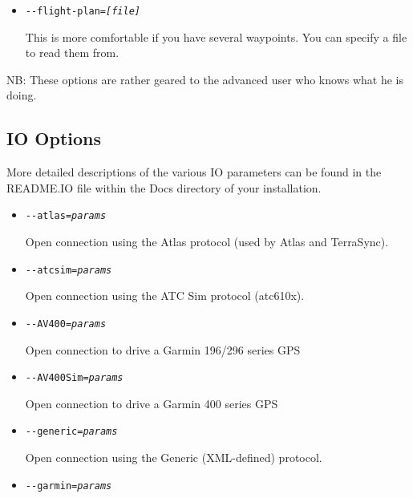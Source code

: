 {\begin{itemize}
  Allows specifying a waypoint for the GC autopilot; it is possible to
  specify multiple waypoints (i.e. a route) via multiple instances of
  this command.

\item{\texttt{-$ $-flight-plan={\it [file]}}}

  This is more comfortable if you have several waypoints. You can
  specify a file to read them from.
\end{itemize}

NB: These options are rather geared to the advanced user who knows what he is doing.

\subsection{IO Options}

More detailed descriptions of the various IO parameters can be found in the README.IO file 
within the Docs directory of your \FlightGear{} installation.

\begin{itemize}

\item{\texttt{-$ $-atlas={\it params}}}

  Open connection using the Atlas protocol (used by Atlas and TerraSync).

\item{\texttt{-$ $-atcsim={\it params}}}

  Open connection using the ATC Sim protocol (atc610x).

\item{\texttt{-$ $-AV400={\it params}}}

  Open connection to drive a Garmin 196/296 series GPS

\item{\texttt{-$ $-AV400Sim={\it params}}}

  Open connection to drive a Garmin 400 series GPS

\item{\texttt{-$ $-generic={\it params}}}

  Open connection using the Generic (XML-defined) protocol.

\item{\texttt{-$ $-garmin={\it params}}}


\end{itemize}}
